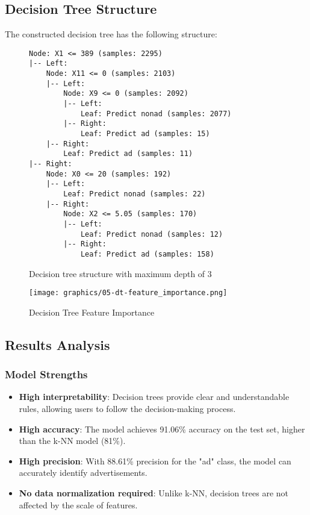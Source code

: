 \subsection{Decision Tree Structure}

The constructed decision tree has the following structure:

\begin{figure}[h]
\centering
\begin{verbatim}
Node: X1 <= 389 (samples: 2295)
|-- Left:
    Node: X11 <= 0 (samples: 2103)
    |-- Left:
        Node: X9 <= 0 (samples: 2092)
        |-- Left:
            Leaf: Predict nonad (samples: 2077)
        |-- Right:
            Leaf: Predict ad (samples: 15)
    |-- Right:
        Leaf: Predict ad (samples: 11)
|-- Right:
    Node: X0 <= 20 (samples: 192)
    |-- Left:
        Leaf: Predict nonad (samples: 22)
    |-- Right:
        Node: X2 <= 5.05 (samples: 170)
        |-- Left:
            Leaf: Predict nonad (samples: 12)
        |-- Right:
            Leaf: Predict ad (samples: 158)
\end{verbatim}
\caption{Decision tree structure with maximum depth of 3}
\end{figure}

\begin{figure}[h]
\centering
\texttt{[image: graphics/05-dt-feature\_importance.png]}
\caption{Decision Tree Feature Importance}
\end{figure}

\subsection{Results Analysis}

\subsubsection{Model Strengths}

\begin{itemize}
    \item \textbf{High interpretability}: Decision trees provide clear and understandable rules, allowing users to follow the decision-making process.
    \item \textbf{High accuracy}: The model achieves 91.06\% accuracy on the test set, higher than the k-NN model (81\%).
    \item \textbf{High precision}: With 88.61\% precision for the "ad" class, the model can accurately identify advertisements.
    \item \textbf{No data normalization required}: Unlike k-NN, decision trees are not affected by the scale of features.
\end{itemize}

